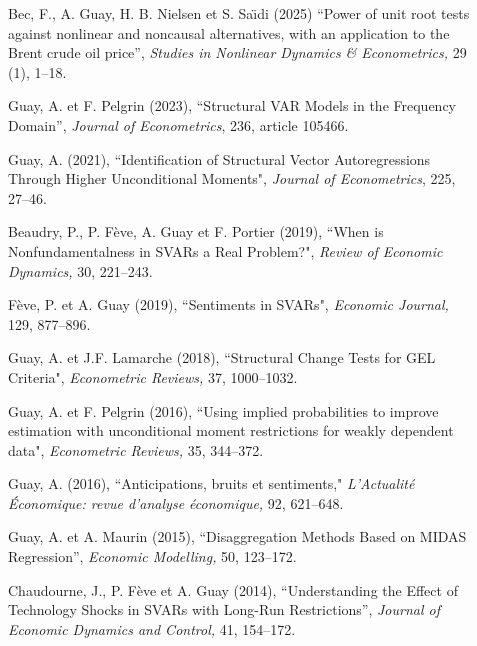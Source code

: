 \begin{description}

\item[]  Bec, F., A. Guay, H. B. Nielsen et S. Sa\"{\i}di (2025) ``Power of unit root tests against
nonlinear and noncausal alternatives,
with an application to the Brent crude oil price'', {\it Studies in Nonlinear Dynamics \& Econometrics,} 29 (1), 1--18.


\item[] Guay, A. et F. Pelgrin (2023), ``Structural VAR Models in the Frequency Domain'', {\it Journal of Econometrics}, 236, article 105466.


\item[] Guay, A. (2021), ``Identification of Structural Vector Autoregressions Through Higher Unconditional Moments", {\it Journal of Econometrics}, 225, 27--46.

\item[] Beaudry, P., P. F\`eve, A. Guay et F. Portier (2019), ``When is Nonfundamentalness in SVARs a Real Problem?", {\it Review of Economic Dynamics,} 30, 221--243.


\item[]  F\`eve, P. et A. Guay (2019), ``Sentiments in SVARs", {\it Economic Journal,} 129, 877--896.



\item[] Guay, A. et J.F. Lamarche (2018), ``Structural Change Tests for GEL Criteria", {\it Econometric Reviews,}
37, 1000--1032.

\item[] Guay, A. et F. Pelgrin (2016), ``Using implied probabilities to improve estimation with
unconditional moment restrictions for weakly dependent data",  {\it Econometric Reviews,} 35, 344--372.

\item[] Guay, A. (2016), ``Anticipations, bruits et sentiments,"   {\it L'Actualit\'e \'Economique: revue d'analyse \'economique,}  92, 621--648.

\item[] Guay, A. et A. Maurin (2015), ``Disaggregation Methods Based on MIDAS Regression'', {\it Economic Modelling,} 50, 123--172.

\item[] Chaudourne, J., P. F\`eve et A. Guay (2014), ``Understanding the Effect of Technology Shocks in SVARs with
Long-Run Restrictions'', {\it Journal of Economic Dynamics and Control,} 41, 154--172.


\end{description}
